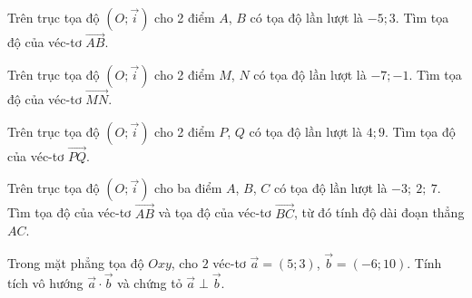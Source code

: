\begin{bt}%
Trên trục tọa độ $\left(O;\overrightarrow{i}\right)$ cho 2 điểm $A$, $B$ có tọa độ lần lượt là $-5; 3$. Tìm tọa độ của véc-tơ $\overrightarrow{AB}$.
\end{bt}

\begin{bt}%
Trên trục tọa độ $\left(O;\overrightarrow{i}\right)$ cho 2 điểm $M$, $N$ có tọa độ lần lượt là $-7; -1$. Tìm tọa độ của véc-tơ $\overrightarrow{MN}$.
\end{bt}

\begin{bt}%
Trên trục tọa độ $\left(O;\overrightarrow{i}\right)$ cho 2 điểm $P$, $Q$ có tọa độ lần lượt là $4; 9$. Tìm tọa độ của véc-tơ $\overrightarrow{PQ}$.
\end{bt}

\begin{bt}%
	Trên trục tọa độ $\left(O;\overrightarrow{i}\right)$ cho ba điểm $A$, $B$, $C$ có tọa độ lần lượt là $-3;\ 2;\ 7$. Tìm tọa độ của véc-tơ $\overrightarrow{AB}$ và tọa độ của véc-tơ $\overrightarrow{BC}$, từ đó tính độ dài đoạn thẳng $AC$.
\end{bt}

\begin{bt}%
Trong mặt phẳng tọa độ $Oxy$, cho $2$ véc-tơ $\overrightarrow{a}=(5;3)$, $\overrightarrow{b}=(-6;10)$. Tính tích vô hướng $\overrightarrow{a}\cdot \overrightarrow{b}$ và chứng tỏ $\overrightarrow{a}\perp\overrightarrow{b}$.
\end{bt}

